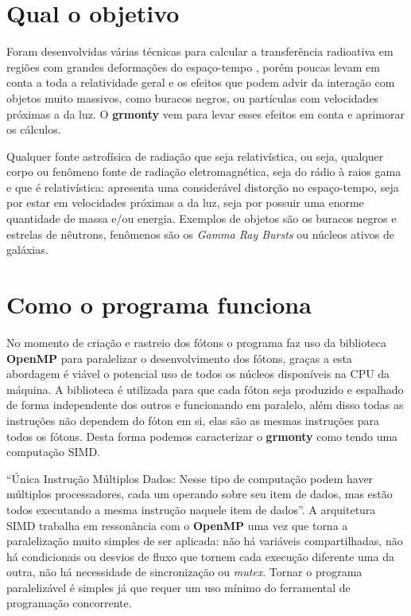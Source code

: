 \section{Qual o objetivo}
  Foram desenvolvidas várias técnicas para calcular a transferência radioativa em regiões com grandes deformações do espaço-tempo \citep{Dolence:09}, porém poucas levam em conta a toda a relatividade geral e os efeitos que podem advir da interação com objetos muito massivos, como buracos negros, ou partículas com velocidades próximas a da luz. O \textbf{grmonty} vem para levar esses efeitos em conta e aprimorar os cálculos.

  Qualquer fonte astrofísica de radiação que seja relativística, ou seja, qualquer corpo ou fenômeno fonte de radiação eletromagnética, seja do rádio à raios gama e que é relativística: apresenta uma considerável distorção no espaço-tempo, seja por estar em velocidades próximas a da luz, seja por possuir uma enorme quantidade de massa e/ou energia. Exemplos de objetos são os buracos negros e estrelas de nêutrons, fenômenos são os \textit{Gamma Ray Bursts} ou núcleos ativos de galáxias.


\section{Como o programa funciona}
\label{sec:comofaz}

  No momento de criação e rastreio dos fótons o programa faz uso da biblioteca \textbf{OpenMP} para paralelizar o desenvolvimento dos fótons, graças a esta abordagem é viável o potencial uso de todos os núcleos disponíveis na CPU da máquina. A biblioteca é utilizada para que cada fóton seja produzido e espalhado de forma independente dos outros e funcionando em paralelo, além disso todas as instruções não dependem do fóton em si, elas são as mesmas instruções para todos os fótons. Desta forma podemos caracterizar o \textbf{grmonty} como tendo uma computação SIMD.

  ``Única Instrução Múltiplos Dados: Nesse tipo de computação podem haver múltiplos processadores, cada um operando sobre seu item de dados, mas estão todos executando a mesma instrução naquele item de dados''\citep[p.84, traduzido]{HCP:16}. A arquitetura SIMD trabalha em ressonância com o \textbf{OpenMP} uma vez que torna a paralelização muito simples de ser aplicada: não há variáveis compartilhadas, não há condicionais ou desvios de fluxo que tornem cada execução diferente uma da outra, não há necessidade de sincronização ou \textit{mutex}. Tornar o programa paralelizável é simples já que requer um uso mínimo do ferramental de programação concorrente.


